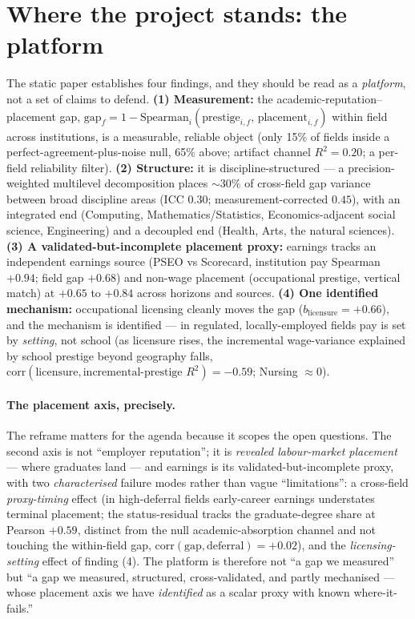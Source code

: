 \documentclass[11pt]{article}
\begin{document}
\section{Where the project stands: the platform}\label{sec:platform}
The static paper establishes four findings, and they should be read as a \emph{platform}, not a set of claims to
defend. \textbf{(1) Measurement:} the academic-reputation--placement gap,
$\mathrm{gap}_f = 1 - \mathrm{Spearman}_i(\text{prestige}_{i,f},\,\text{placement}_{i,f})$ within field across
institutions, is a measurable, reliable object (only 15\% of fields inside a perfect-agreement-plus-noise null,
65\% above; artifact channel $R^2=0.20$; a per-field reliability filter). \textbf{(2) Structure:} it is
discipline-structured --- a precision-weighted multilevel decomposition places $\sim$30\% of cross-field gap
variance between broad discipline areas (ICC $0.30$; measurement-corrected $0.45$), with an integrated end
(Computing, Mathematics/Statistics, Economics-adjacent social science, Engineering) and a decoupled end (Health,
Arts, the natural sciences). \textbf{(3) A validated-but-incomplete placement proxy:} earnings tracks an
independent earnings source (PSEO vs Scorecard, institution pay Spearman $+0.94$; field gap $+0.68$) and non-wage
placement (occupational prestige, vertical match) at $+0.65$ to $+0.84$ across horizons and sources.
\textbf{(4) One identified mechanism:} occupational licensing cleanly moves the gap ($b_{\text{licensure}}=+0.66$),
and the mechanism is identified --- in regulated, locally-employed fields pay is set by \emph{setting}, not school
(as licensure rises, the incremental wage-variance explained by school prestige beyond geography falls,
$\mathrm{corr}(\text{licensure},\text{incremental-prestige }R^2)=-0.59$; Nursing $\approx 0$).

\paragraph{The placement axis, precisely.} The reframe matters for the agenda because it scopes the open
questions. The second axis is not ``employer reputation''; it is \emph{revealed labour-market placement} ---
where graduates land --- and earnings is its validated-but-incomplete proxy, with two \emph{characterised} failure
modes rather than vague ``limitations'': a cross-field \emph{proxy-timing} effect (in high-deferral fields
early-career earnings understates terminal placement; the status-residual tracks the graduate-degree share at
Pearson $+0.59$, distinct from the null academic-absorption channel and not touching the within-field gap,
$\mathrm{corr}(\text{gap},\text{deferral})=+0.02$), and the \emph{licensing-setting} effect of finding (4). The
platform is therefore not ``a gap we measured'' but ``a gap we measured, structured, cross-validated, and partly
mechanised --- whose placement axis we have \emph{identified} as a scalar proxy with known where-it-fails.''
\end{document}
